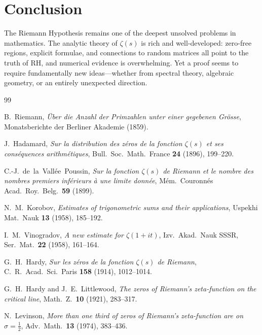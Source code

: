 \documentclass[12pt,a4paper]{article}
\theoremstyle{remark}
\begin{document}
\section{Conclusion}

The Riemann Hypothesis remains one of the deepest unsolved problems in mathematics.
The analytic theory of $\zeta(s)$ is rich and well-developed: zero-free regions,
explicit formulae, and connections to random matrices all point to the truth of RH,
and numerical evidence is overwhelming.  Yet a proof seems to require fundamentally
new ideas—whether from spectral theory, algebraic geometry, or an entirely
unexpected direction.

\begin{thebibliography}{99}

B.~Riemann,
\textit{Über die Anzahl der Primzahlen unter einer gegebenen Grösse},
Monatsberichte der Berliner Akademie (1859).

J.~Hadamard,
\textit{Sur la distribution des zéros de la fonction $\zeta(s)$ et ses conséquences
arithmétiques},
Bull.\ Soc.\ Math.\ France \textbf{24} (1896), 199--220.

C.-J.~de~la~Vallée~Poussin,
\textit{Sur la fonction $\zeta(s)$ de Riemann et le nombre des nombres premiers inférieurs
à une limite donnée},
Mém.\ Couronnés Acad.\ Roy.\ Belg.\ \textbf{59} (1899).

N.~M.~Korobov,
\textit{Estimates of trigonometric sums and their applications},
Uspekhi Mat.\ Nauk \textbf{13} (1958), 185--192.

I.~M.~Vinogradov,
\textit{A new estimate for $\zeta(1+it)$},
Izv.\ Akad.\ Nauk SSSR, Ser.\ Mat.\ \textbf{22} (1958), 161--164.

G.~H.~Hardy,
\textit{Sur les zéros de la fonction $\zeta(s)$ de Riemann},
C.\ R.\ Acad.\ Sci.\ Paris \textbf{158} (1914), 1012--1014.

G.~H.~Hardy and J.~E.~Littlewood,
\textit{The zeros of Riemann's zeta-function on the critical line},
Math.\ Z.\ \textbf{10} (1921), 283--317.

N.~Levinson,
\textit{More than one third of zeros of Riemann's zeta-function are on $\sigma=\tfrac{1}{2}$},
Adv.\ Math.\ \textbf{13} (1974), 383--436.


\end{thebibliography}
\end{document}
